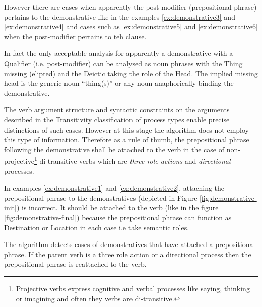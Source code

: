 However there are cases when apparently the post-modifier (prepositional phrase) pertains to the demonstrative like in the examples \ref{ex:demonstrative3} and \ref{ex:demonstrative4} and cases such as \ref{ex:demonstrative5} and \ref{ex:demonstrative6} when the post-modifier pertains to teh clause. 

In fact the only acceptable analysis for apparently a demonstrative with a Qualifier (i.e. post-modifier) can be analysed as noun phrases with the Thing missing (elipted) and the Deictic taking the role of the Head. The implied missing head is the generic noun ``thing(s)'' or any noun anaphorically binding the demonstrative.

The verb argument structure and syntactic constraints on the arguments described in the Transitivity classification of process types enable precise distinctions of such cases. However at this stage the algorithm does not employ this type of information. Therefore as a rule of thumb, the prepositional phrase following the demonstrative shall be attached to the verb in the case of non-projective\footnote{Projective verbs express cognitive and verbal processes like saying, thinking or imagining and often they verbs are di-transitive.} di-transitive verbs which are \textit{three role actions} and \textit{directional} processes.

In examples \ref{ex:demonstrative1} and \ref{ex:demonstrative2}, attaching the prepositional phrase to the demonstratives (depicted in Figure \ref{fig:demonstrative-init}) is incorrect. It should be attached to the verb (like in the figure \ref{fig:demonstrative-final}) because the prepositional phrase can function as Destination or Location in each case i.e take semantic roles. 

The algorithm detects cases of demonstratives that have attached a prepositional phrase. If the parent verb is a three role action or a directional process then the prepositional phrase is reattached to the verb.

